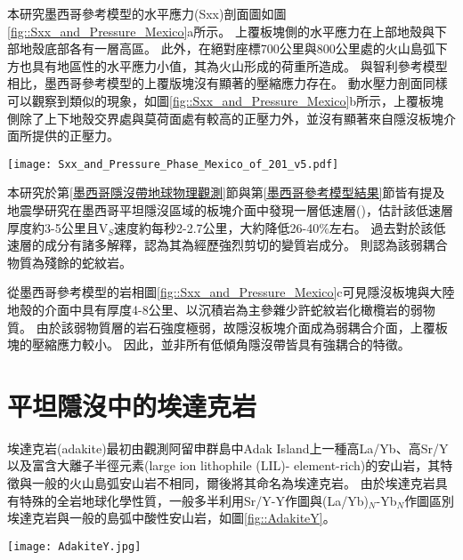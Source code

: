 本研究墨西哥參考模型的水平應力(Sxx)剖面圖如圖\ref{fig::Sxx_and_Pressure_Mexico}a所示。
上覆板塊側的水平應力在上部地殼與下部地殼底部各有一層高區。
此外，在絕對座標700公里與800公里處的火山島弧下方也具有地區性的水平應力小值，其為火山形成的荷重所造成。
與智利參考模型相比，墨西哥參考模型的上覆版塊沒有顯著的壓縮應力存在。
動水壓力剖面同樣可以觀察到類似的現象，如圖\ref{fig::Sxx_and_Pressure_Mexico}b所示，上覆板塊側除了上下地殼交界處與莫荷面處有較高的正壓力外，並沒有顯著來自隱沒板塊介面所提供的正壓力。
\begin{figure*}[ht!]
    \centering
    \texttt{[image: Sxx\_and\_Pressure\_Phase\_Mexico\_of\_201\_v5.pdf]}
    \caption[墨西哥參考模型中於40 Myr的剖面]{墨西哥參考模型中於40 Myr的水平軸差應力、動水壓力與岩相剖面。(a)水平軸差應力剖面，其中應力正向代表拉張應力，負向代表壓縮應力。(b)動水壓力剖面。(c)模型岩相剖面，岩相顏色請見圖\ref{fig::Ref Cocos 26}。}
    \label{fig::Sxx_and_Pressure_Mexico}
\end{figure*}

本研究於第\ref{墨西哥隱沒帶地球物理觀測}節與第\ref{墨西哥參考模型結果}節皆有提及地震學研究在墨西哥平坦隱沒區域的板塊介面中發現一層低速層(\citealp{PerezCampos2008})，\citealp{Song2009}估計該低速層厚度約3-5公里且V$_S$速度約每秒2-2.7公里，大約降低26-40$\%$左右。
過去對於該低速層的成分有諸多解釋，\citet{Song2012SC}認為其為經歷強烈剪切的變質岩成分。
\citet{Manea2017}則認為該弱耦合物質為殘餘的蛇紋岩。

從墨西哥參考模型的岩相圖\ref{fig::Sxx_and_Pressure_Mexico}c可見隱沒板塊與大陸地殼的介面中具有厚度4-8公里、以沉積岩為主參雜少許蛇紋岩化橄欖岩的弱物質。
由於該弱物質層的岩石強度極弱，故隱沒板塊介面成為弱耦合介面，上覆板塊的壓縮應力較小。
因此，並非所有低傾角隱沒帶皆具有強耦合的特徵。

\section{平坦隱沒中的埃達克岩}\label{平坦隱沒中的埃達克岩}
埃達克岩(adakite)最初由\citet{kay1978aleutian}觀測阿留申群島中Adak Island上一種高La/Yb、高Sr/Y以及富含大離子半徑元素(large ion lithophile (LIL)- element-rich)的安山岩，其特徵與一般的火山島弧安山岩不相同，爾後\citet{defant1990derivation}將其命名為埃達克岩。
由於埃達克岩具有特殊的全岩地球化學性質，一般多半利用Sr/Y-Y作圖與(La/Yb)$_N$-Yb$_N$作圖區別埃達克岩與一般的島弧中酸性安山岩，如圖\ref{fig::AdakiteY}。

\begin{figure*}[h]
    \centering
    \texttt{[image: AdakiteY.jpg]}
    \caption[Sr/Y-Y作圖與(La/Yb)$_N$-Yb$_N$作圖]{(A)Sr/Y-Y作圖與(B)(La/Yb)$_N$-Yb$_N$作圖，摘自\citet{castillo2012adakite}。通常用於區分埃達克岩與普通島弧安山岩、石英岩與流紋岩(normal arc andesite, dacite and rhyolite, ADR)。紫色實線邊界來自於\citet{richards2007special}所提出菲律賓中南部埃達克岩與普通島弧安山岩的資料。}
    \label{fig::AdakiteY}
\end{figure*}

